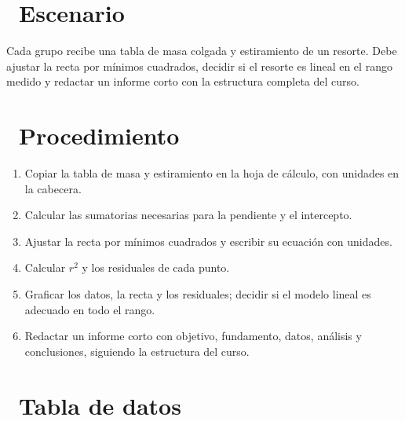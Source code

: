 \documentclass[11pt,a4paper]{article}
\newcommand{\iconotexto}[2]{\textcolor{cyanNeon}{\faIcon{#1}}~#2}
\begin{document}
\section{\iconotexto{flask}{Escenario}}

Cada grupo recibe una tabla de masa colgada y estiramiento de un resorte. Debe ajustar la recta por mínimos cuadrados, decidir si el resorte es lineal en el rango medido y redactar un informe corto con la estructura completa del curso.

\section{\iconotexto{list-ol}{Procedimiento}}

\begin{enumerate}[leftmargin=1.4em,itemsep=2pt,topsep=3pt]
  \item Copiar la tabla de masa y estiramiento en la hoja de cálculo, con unidades en la cabecera.
  \item Calcular las sumatorias necesarias para la pendiente y el intercepto.
  \item Ajustar la recta por mínimos cuadrados y escribir su ecuación con unidades.
  \item Calcular $r^2$ y los residuales de cada punto.
  \item Graficar los datos, la recta y los residuales; decidir si el modelo lineal es adecuado en todo el rango.
  \item Redactar un informe corto con objetivo, fundamento, datos, análisis y conclusiones, siguiendo la estructura del curso.
\end{enumerate}

\section{\iconotexto{table}{Tabla de datos}}
\end{document}

